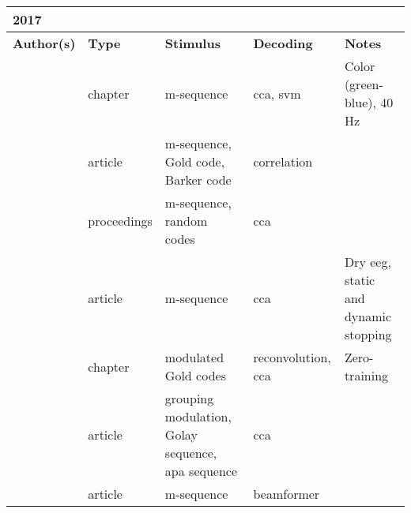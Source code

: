 \documentclass[a4paper,landscape]{article}
\begin{document}
\begin{table}[H]
	\begin{tabular}{p{5cm}p{2cm}p{5cm}p{5cm}p{6.5cm}}
		\textbf{2017} & & & & \\
		\toprule
		\textbf{Author(s)} & \textbf{Type} & \textbf{Stimulus} & \textbf{Decoding} & \textbf{Notes} \\
		\midrule
		\citeauthor{aminaka2017} & chapter & m-sequence & \acrshort{cca},  \acrshort{svm} & Color (green-blue), 40 Hz \\
		\citeauthor{isaksen2017} & article & m-sequence, Gold code, Barker code & correlation & \\
		\citeauthor{nagel2017} & proceedings & m-sequence, random codes & \acrshort{cca} & \\
		\citeauthor{spuler2017} & article & m-sequence & \acrshort{cca} & Dry \acrshort{eeg}, static and dynamic stopping \\
		\citeauthor{thielen2017} & chapter & modulated Gold codes & reconvolution, \acrshort{cca} & Zero-training \\
		\citeauthor{wei2017} & article & grouping modulation, Golay sequence, \acrshort{apa} sequence & \acrshort{cca} & \\
		\citeauthor{wittevrongel2017} & article & m-sequence & beamformer & \\
		\bottomrule
	\end{tabular}
\end{table}
\end{document}
